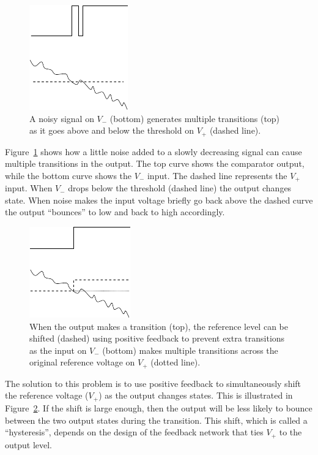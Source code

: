 \documentclass{article}
\begin{document}
\begin{figure}
\begin{center}
\includegraphics{pics/single_threshold}
\end{center}
\caption{A noisy signal on $V_-$ (bottom) generates multiple transitions (top) as it goes above and below the threshold on $V_+$ (dashed line).}
\label{fig:single_threshold}
\end{figure}

Figure~\ref{fig:single_threshold} shows how a little noise added to a slowly decreasing signal can cause multiple transitions in the output. The top curve shows the comparator output, while the bottom curve shows the $V_-$ input. The dashed line represents the $V_+$ input. When $V_-$ drops below the threshold (dashed line) the output changes state. When noise makes the input voltage briefly go back above the dashed curve the output ``bounces'' to low and back to high accordingly.

\begin{figure}
\begin{center}
\includegraphics{pics/double_threshold}
\end{center}
\caption{When the output makes a transition (top), the reference level can be shifted (dashed) using positive feedback to prevent extra transitions as the input on $V_-$ (bottom) makes multiple transitions across the original reference voltage on $V_+$ (dotted line).}
\label{fig:double_threshold}
\end{figure}

The solution to this problem is to use positive feedback to simultaneously shift the reference voltage ($V_+$) as the output changes states. This is illustrated in Figure~\ref{fig:double_threshold}. If the shift is large enough, then the output will be less likely to bounce between the two output states during the transition. This shift, which is called a ``hysteresis'', depends on the design of the feedback network that ties $V_+$ to the output level.
\end{document}
